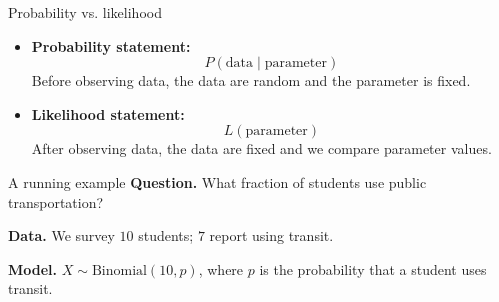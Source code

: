 \documentclass[slidestop,compress,mathserif]{beamer}
\begin{document}
\begin{frame}{Probability vs. likelihood}
\begin{itemize}
\item \textbf{Probability statement:}
\[P(\text{data}\mid \text{parameter})\]
Before observing data, the data are random and the parameter is fixed.
\item \textbf{Likelihood statement:}
\[L(\text{parameter})\]
After observing data, the data are fixed and we compare parameter values.
\end{itemize}
\end{frame}

\begin{frame}{A running example}
\textbf{Question.} What fraction of students use public transportation?
\medskip

\textbf{Data.} We survey $10$ students; $7$ report using transit.
\medskip

\textbf{Model.} $X\sim\text{Binomial}(10,p)$, where $p$ is the probability that a student uses transit.
\end{frame}
\end{document}
